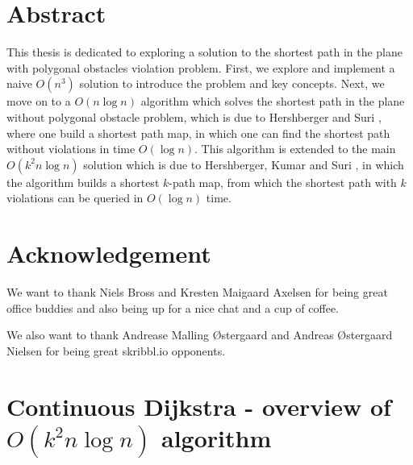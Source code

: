 \frontmatter

\maketitle %

\thispagestyle{empty}

\newpage

\chapter*{Abstract}

This thesis is dedicated to exploring a solution to the shortest path in the
plane with polygonal obstacles violation problem. First, we explore and
implement a naive $O(n^3)$ solution to introduce the problem and key concepts.
Next, we move on to a $O(n \log n)$ algorithm which solves the shortest path in
the plane without polygonal obstacle problem, which is due to Hershberger and
Suri \cite{HershbergerS99}, where one build a shortest path map, in which one
can find the shortest path without violations in time $O(\log n)$. This
algorithm is extended to the main $O(k^2 n \log n)$ solution which is due to
Hershberger, Kumar and Suri \cite{HershbergerKS17}, in which the algorithm
builds a shortest $k$-path map, from which the shortest path with $k$
violations can be queried in $O(\log n)$ time. 

\newpage
\chapter*{Acknowledgement}

We want to thank Niels Bross and Kresten Maigaard Axelsen for being great office buddies and also being up for a nice chat and a cup of coffee. 

We also want to thank Andrease Malling Østergaard and Andreas Østergaard Nielsen for being great skribbl.io opponents. 
\newpage


\tableofcontents
\listoffigures
\listofalgorithms
\listoftables
\mainmatter





\chapter{Continuous Dijkstra - overview of $O(k^2 n \log n)$ algorithm}




